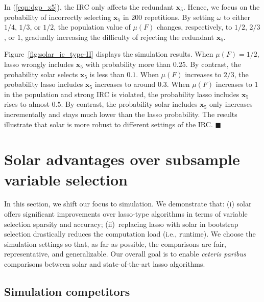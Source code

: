 \documentclass[11pt,review,authoryear]{elsarticle}
\begin{document}
In (\ref{eqn:dgp_x5}), the IRC only affects the redundant $\mathbf{x}_5$. Hence, we focus on the probability of incorrectly selecting $\mathbf{x}_5$ in 200 repetitions. By setting $\omega$ to either $1/4$, $1/3$, or $1/2$, the population value of $\mu \left( F \right)$ changes, respectively, to $1/2$, $2/3$, or $1$, gradually increasing the difficulty of rejecting the redundant $\mathbf{x}_5$.

Figure~\ref{fig:solar_ic_type-II} displays the simulation results. When $\mu \left( F \right) = 1/2$, lasso wrongly includes $\mathbf{x}_5$ with probability more than $0.25$. By contrast, the probability solar selects $\mathbf{x}_5$ is less than $0.1$. When $\mu \left( F \right)$ increases to $2/3$, the probability lasso includes $\mathbf{x}_5$ increases to around $0.3$. When $\mu \left( F \right)$ increases to $1$ in the population and strong IRC is violated, the probability lasso includes $\mathbf{x}_5$ rises to almost $0.5$. By contrast, the probability solar includes $\mathbf{x}_5$ only increases incrementally and stays much lower than the lasso probability. The results illustrate that solar is more robust to different settings of the IRC. $\blacksquare$



\section{Solar advantages over subsample variable selection\label{section:comp}}

In this section, we shift our focus to simulation. We demonstrate that: (i) solar offers significant improvements over lasso-type algorithms in terms of variable selection sparsity and accuracy; (ii)~replacing lasso with solar in bootstrap selection drastically reduces the computation load (i.e., runtime). We choose the simulation settings so that, as far as possible, the comparisons are fair, representative, and generalizable. Our overall goal is to enable \emph{ceteris paribus} comparisons between solar and state-of-the-art lasso algorithms.

\subsection{Simulation competitors}
\end{document}

